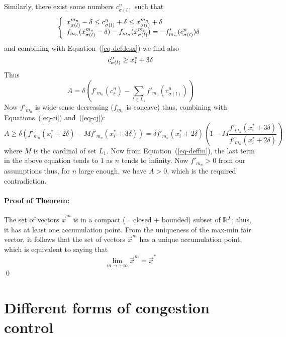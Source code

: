 Similarly, there exist some numbers $c^{n}_{\sigma(l)}$ such that
$$
\left\{\begin{array}{l} 
 x^{m_n}_{\sigma(l)}  -  \delta \leq c^{n}_{\sigma(l)}+ \delta \leq x^{m_n}_{\sigma(l)}+
 \delta \\
 f_{m_n}(x^{m_n}_{\sigma(l)} - \delta) - f_{m_n}(x^{m_n}_{\sigma(l)} ) =
 - f'_{m_n}(c^{n}_{\sigma(l)})\delta
  \end{array} \right.
$$
and combining with Equation~(\ref{eq-defdesx}) we find also
\begin{equation}\mylabel{eq-cj}
c^{n}_{\sigma(l)} \geq x^*_i +  3 \delta
\end{equation}
Thus
$$
A = \delta \left(
 f'_{m_n}(c^{n}_i)
 -
 \sum_{l \in L_1} f'_{m_n}(c^{n}_{\sigma(l)})
  \right)
$$
Now $f'_{m_n}$ is wide-sense decreasing ($f_{m_n}$ is concave)
thus, combining with Equations~(\ref{eq-ci}) and~(\ref{eq-cj}):
$$A
\geq \delta \left(f'_{m_n}(x^*_i + 2 \delta) - M  f'_{m_n}(x^*_i + 3 \delta)\right) = \delta
f'_{m_n}(x^*_i + 2 \delta) \left( 1- M \frac{f'_{m_n}(x^*_i + 3 \delta)}{f'_{m_n}(x^*_i + 2
\delta)} \right)
$$
where $M$ is the cardinal of set $L_1$. Now from
Equation~(\ref{eq-deffm}), the last term in the above equation
tends to $1$ as $n$ tends to infinity. Now $f'_{m_n} >0$ from our
assumptions thus, for $n$ large enough, we have $A >0$, which is
the required contradiction.

\paragraph{Proof of Theorem: }

The set of vectors $\vec{x}^m$ is in a compact (= closed +
bounded) subset of $\Bbb{R}^I$; thus, it has at least one
accumulation point. From the uniqueness of the max-min fair
vector, it follows that the set of vectors $\vec{x}^m$ has a
unique accumulation point, which is equivalent to saying that
$$
\lim_{m \rightarrow + \infty} \vec{x}^m = \vec{x}^*
$$
\qed

\section{Different forms of congestion control}

